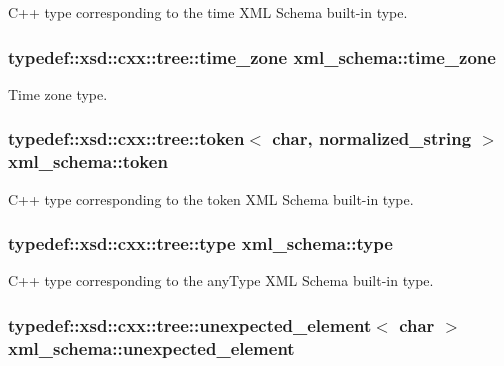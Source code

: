 C++ type corresponding to the time X\-M\-L Schema built-\/in type. 

\hypertarget{namespacexml__schema_ab32f228c8863c36bf48dbb7356c50c0e}{
\subsubsection[{time\-\_\-zone}]{\setlength{\rightskip}{0pt plus 5cm}typedef\-::xsd\-::cxx\-::tree\-::time\-\_\-zone {\bf xml\-\_\-schema\-::time\-\_\-zone}}}\label{namespacexml__schema_ab32f228c8863c36bf48dbb7356c50c0e}


Time zone type. 

\hypertarget{namespacexml__schema_aac8666db04b41e8b19afa60d8ecb1e89}{
\subsubsection[{token}]{\setlength{\rightskip}{0pt plus 5cm}typedef\-::xsd\-::cxx\-::tree\-::token$<$ char, {\bf normalized\-\_\-string} $>$ {\bf xml\-\_\-schema\-::token}}}\label{namespacexml__schema_aac8666db04b41e8b19afa60d8ecb1e89}


C++ type corresponding to the token X\-M\-L Schema built-\/in type. 

\hypertarget{namespacexml__schema_a4bf7f144ce936a6a393de26f4cb707f0}{
\subsubsection[{type}]{\setlength{\rightskip}{0pt plus 5cm}typedef\-::xsd\-::cxx\-::tree\-::type {\bf xml\-\_\-schema\-::type}}}\label{namespacexml__schema_a4bf7f144ce936a6a393de26f4cb707f0}


C++ type corresponding to the any\-Type X\-M\-L Schema built-\/in type. 

\hypertarget{namespacexml__schema_a381b3f3410f9f6ba1f44c5500d90345b}{
\subsubsection[{unexpected\-\_\-element}]{\setlength{\rightskip}{0pt plus 5cm}typedef\-::xsd\-::cxx\-::tree\-::unexpected\-\_\-element$<$ char $>$ {\bf xml\-\_\-schema\-::unexpected\-\_\-element}}}\label{namespacexml__schema_a381b3f3410f9f6ba1f44c5500d90345b}


